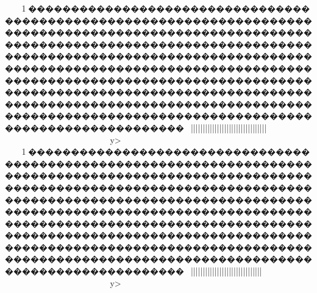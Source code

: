 {{{{{{{{{{{{{{{{{{{{{{{{{{{{{{{{{{{{{{{{{{{{{{{{{{{{{{{{{{{{{{{{{{{{{{{{{{{{{{{{{{{{{{{{{{{{{{{{{{{{{{{{{{{{{{{{{{{{{{{{{{{{{{{{{{{{{{{{{{{{{{{{{{{{{{{{{{{{{{{{{{{{{{{{{{{{{{{{{{{{{{{{{{{{{{{{{{{{{{{{{{{{{{{{{{{{{{{{{{{{{{{{{{{{{{{{{{{{{{{{{{{{{{{{{{{{{{{{{{{{{{{{{{{{{{{{{{{{{{{{{{{{{{{{{{{{{{{{{{{{{{{{{{{{{{{{{{{{{{{{{{{{{{{{{{{{{{{{{{{{{{{{{{{{{{{{{{{{{{{{{{{{{{{{{{{{{{{{{{{{{{{{{{{{{{{{{{{{{{{{{{{{{{{{{{{{{{{{{{{{{{{{{{{{{{{{{{{{{{{{{{{{{{{{{{{{{{{{{{{{{{{{{{{{{{{{{{{{{{{{{{{{{{{{{{{{{{{{{{{{{{{{{{{{{{{{{{{{{{{{{{{{{{{{{{{{{{{{{{{{{{{{{{{{{{{{{{{{{{{{{{{{{{{{{{{{{{{{{{{{{{{{{{{{{{{{{{{{{{{{{{{{{{{{{{{{{{{{{{{{{{{{{{{{{{{{{{{{{{{{{{{{{{{{{{{{{{{{{{{{{{{{{{{{{{{{{{{{{{{{{{{{{{{{{{{{{{{{{{{{{{{{{{{{{{{{{{{{{{{{{{{{{{{{{{{{{{{{{{{{{{{{{{{{{{{{{{{{{{{{{{{{{{{{{{{{{{{{{{{{{{{{{{{{{{{{{{{{{{{{{{{{{{{{{{{{{{{{{{{{{{{{{{{{{{{{{{{{{{{{{{{{{{{{{{{{{{{{{{{{{{{{{{{{{{{{{{{{{{{{{{{{{{{{{{{{{{{{{{{{{{{{{{{{{{{{{{{{{{{{{{{{{{{{{{{{{{{{{{{{{{{{{{{{{{{{{{{{{{{{{{{{{{{{{{{{{{{{{{{{{{{{{{{{{{{{{{{{{{{{{{{{{{{1\ky������������������������������������������������������������������������������������������������������������������������������������������������������������������������������������������������������������������������������������������������������������������������������������������������������������������������������������������������������������������������������������������~}}||}}}}}||||||||||||||||||{{{{{{||||||||||||}}}}~~~~~~~~~~~~~~y>
1\ky������������������������������������������������������������������������������������������������������������������������������������������������������������������������������������������������������������������������������������������������������������������������������������������������������������������������������������������������������������������������������������������~}}||}}}}}||||||||||||||||{{{{{{{{||||||||||||}}}}~~~~~~~~~~~~~~y>
}}}}}}}}}}}}}}}}}}}}}}}}}}}}}}}}}}}}}}}}}}}}}}}}}}}}}}}}}}}}}}}}}}}}}}}}}}}}}}}}}}}}}}}}}}}}}}}}}}}}}}}}}}}}}}}}}}}}}}}}}}}}}}}}}}}}}}}}}}}}}}}}}}}}}}}}}}}}}}}}}}}}}}}}}}}}}}}}}}}}}}}}}}}}}}}}}}}}}}}}}}}}}}}}}}}}}}}}}}}}}}}}}}}}}}}}}}}}}}}}}}}}}}}}}}}}}}}}}}}}}}}}}}}}}}}}}}}}}}}}}}}}}}}}}}}}}}}}}}}}}}}}}}}}}}}}}}}}}}}}}}}}}}}}}}}}}}}}}}}}}}}}}}}}}}}}}}}}}}}}}}}}}}}}}}}}}}}}}}}}}}}}}}}}}}}}}}}}}}}}}}}}}}}}}}}}}}}}}}}}}}}}}}}}}}}}}}}}}}}}}}}}}}}}}}}}}}}}}}}}}}}}}}}}}}}}}}}}}}}}}}}}}}}}}}}}}}}}}}}}}}}}}}}}}}}}}}}}}}}}}}}}}}}}}}}}}}}}}}}}}}}}}}}}}}}}}}}}}}}}}}}}}}}}}}}}}}}}}}}}}}}}}}}}}}}}}}}}}}}}}}}}}}}}}}}}}}}}}}}}}}}}}}}}}}}}}}}}}}}}}}}}}}}}}}}}}}}}}}}}}}}}}}}}}}}}}}}}}}}}}}}}}}}}}}}}}}}}}}}}}}}}}}}}}}}}}}}}}}}}}}}}}}}}}}}}}}}}}}}}}}}}}}}}}}}}}}}}}}}}}}}}}}}}}}}}}}}}}}}}}}}}}}}}}}}}}}}}}}}}}}}}}}}}}}}}}}}}}}}}}}}}}}}}}}}}}}}}}}}}}}}}}}}}}}}}}}}}}}}}}}}}}}}}}}}}}}}}}}}}}}}}}}}}}}}}}}}}}}}}}}}}}}}}}}}}}}}}}}}}}}}}}}}}}}}}}}}}}}}}}}}}}}}}}}}}}}}}}}}}}}}}}}}}}}}}}}}}}}}}}}}}}}}}}}}}}}}}}}}
